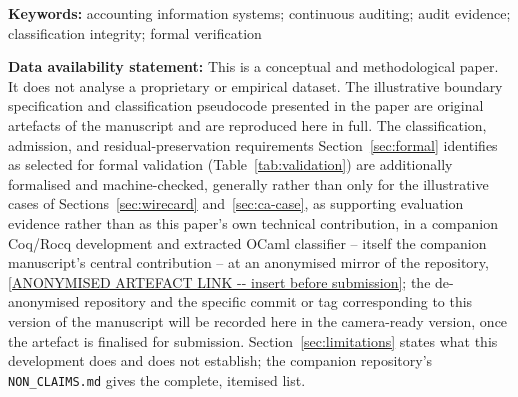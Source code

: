 \documentclass[11pt,a4paper]{article}
\theoremstyle{definition}
\theoremstyle{remark}
\begin{document}
\noindent\textbf{Keywords:} accounting information systems; continuous auditing; audit evidence; classification integrity; formal verification

\medskip
\noindent\textbf{Data availability statement:} This is a conceptual and methodological paper. It does not analyse a proprietary or empirical dataset. The illustrative boundary specification and classification pseudocode presented in the paper are original artefacts of the manuscript and are reproduced here in full. The classification, admission, and residual-preservation requirements Section~\ref{sec:formal} identifies as selected for formal validation (Table~\ref{tab:validation}) are additionally formalised and machine-checked, generally rather than only for the illustrative cases of Sections~\ref{sec:wirecard} and~\ref{sec:ca-case}, as supporting evaluation evidence rather than as this paper's own technical contribution, in a companion Coq/Rocq development and extracted OCaml classifier -- itself the companion manuscript's central contribution -- at an anonymised mirror of the repository, \url{[ANONYMISED ARTEFACT LINK -- insert before submission]}; the de-anonymised repository and the specific commit or tag corresponding to this version of the manuscript will be recorded here in the camera-ready version, once the artefact is finalised for submission. Section~\ref{sec:limitations} states what this development does and does not establish; the companion repository's \texttt{NON\_CLAIMS.md} gives the complete, itemised list.
\end{document}
